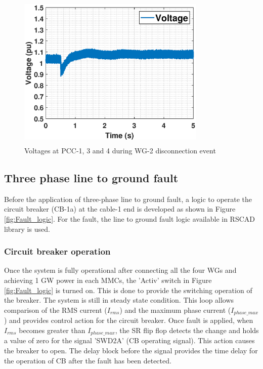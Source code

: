 \begin{figure}[H]
\centering
    \includegraphics[height = 7.5cm,width = 9cm]{Diagrams/Chapter_5/VACP_WT134_WT2off.eps}
    \caption{Voltages at PCC-1, 3 and 4 during WG-2 disconnection event}
    \label{VACP_WT134_WT2off}
\end{figure}

\subsection{Three phase line to ground fault}

Before the application of three-phase line to ground fault, a logic to operate the circuit breaker (CB-1a) at the cable-1 end is developed as shown in Figure \ref{fig:Fault_logic}. For the fault, the line to ground fault logic available in RSCAD library is used.

\subsubsection{Circuit breaker operation}\label{Fault logic and cb}
Once the system is fully operational after connecting all the four \gls{WG}s and achieving 1 GW power in each \gls{MMC}s, the 'Activ' switch in Figure \ref{fig:Fault_logic} is turned on. This is done to provide the switching operation of the breaker. The system is still in steady state condition. This loop allows comparison of the RMS current ($I_{rms}$) and the maximum phase current ($I_{phase\_max}$) and provides control action for the circuit breaker. Once fault is applied, when $I_{rms}$ becomes greater than $I_{phase\_max}$, the SR flip flop detects the change and holds a value of zero for the signal 'SWD2A' (\gls{CB} operating signal). This action causes the breaker to open. The delay block before the signal provides the time delay for the operation of \gls{CB} after the fault has been detected.

